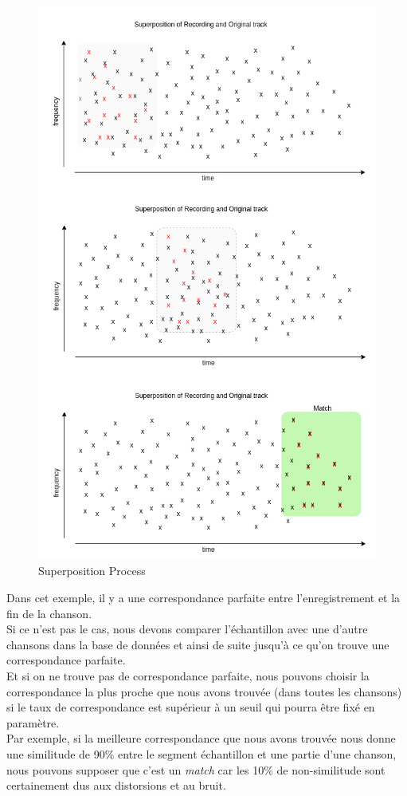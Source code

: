 \documentclass[11pt, report, french]{scrreprt}
\begin{document}
\begin{figure}[H]
	\centering
	\includegraphics[scale=0.6]{img/superposition_process.png}
	\caption{Superposition Process}
\end{figure}

Dans cet exemple, il y a une correspondance parfaite entre l'enregistrement et la fin de la chanson.\\
Si ce n'est pas le cas, nous devons comparer l'échantillon avec une d'autre chansons dans la base de données et ainsi de suite jusqu'à ce qu'on trouve une correspondance parfaite.\\
Et si on ne trouve pas de correspondance parfaite, nous pouvons choisir la correspondance la plus proche que nous avons trouvée (dans toutes les chansons) si le taux de correspondance est supérieur à un seuil qui pourra être fixé en paramètre.\\
Par exemple, si la meilleure correspondance que nous avons trouvée nous donne une similitude de 90\% entre le segment échantillon et une partie d'une chanson, nous pouvons supposer que c'est un \textit{match} car les 10\% de non-similitude sont certainement dus aux distorsions et au bruit.\\
\end{document}
